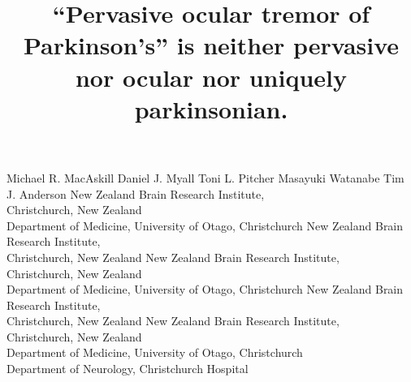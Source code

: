 \documentclass[jou,a4paper]{apa6}
\begin{document}
\newcommand{\jemrVolume}{x}
\newcommand{\jemrIssue}{y}
\newcommand{\jemrArticle}{z}
\newcommand{\jemrLastPage}{\pageref{LastPage}}
\newcommand{\jemrReceivedDate}{December 15, 2015}
\newcommand{\jemrPublishedDate}{January 30, 2016}
\newcommand{\jemrShortTitle}{Manuscript Submission}


\title{``Pervasive ocular tremor of Parkinson's'' is neither pervasive nor ocular nor uniquely parkinsonian.}
\fiveauthors
	{Michael R. MacAskill}
	{Daniel J. Myall}
	{Toni L. Pitcher}
	{Masayuki Watanabe}
	{Tim J. Anderson}
\fiveaffiliations
    {New Zealand Brain Research Institute,\\Christchurch, New Zealand\\
    Department of Medicine, University of Otago, Christchurch}
    {New Zealand Brain Research Institute,\\Christchurch, New Zealand}
    {New Zealand Brain Research Institute,\\Christchurch, New Zealand\\
    Department of Medicine, University of Otago, Christchurch}
	{New Zealand Brain Research Institute,\\Christchurch, New Zealand}
    {New Zealand Brain Research Institute,\\Christchurch, New Zealand\\
    Department of Medicine, University of Otago, Christchurch\\
    Department of Neurology, Christchurch Hospital}
\end{document}
